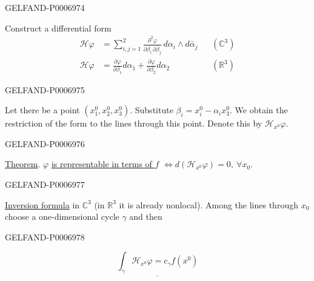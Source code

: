 \begin{GelfandAdjacentEvidence}{GELFAND-P000697}{4}


Construct a differential form
\[
\begin{aligned}
\mathcal H\varphi
&=\sum_{i,j=1}^{2}
\frac{\partial^2\varphi}{\partial\beta_i\,\partial\bar{\beta}_j}\,
d\alpha_i\wedge d\bar{\alpha}_j
&&(\mathbb C^3)\\
\mathcal H\varphi
&=\frac{\partial\varphi}{\partial\beta_1}d\alpha_1
+\frac{\partial\varphi}{\partial\beta_2}d\alpha_2
&&(\mathbb R^3)
\end{aligned}
\]
\end{GelfandAdjacentEvidence}
\begin{GelfandAdjacentEvidence}{GELFAND-P000697}{5}


Let there be a point \((x_1^0,x_2^0,x_3^0)\).
Substitute \(\beta_i=x_i^0-\alpha_i x_3^0\).
We obtain the restriction of the form to the lines through this point.
Denote this by \(\mathcal H_{x^0}\varphi\).
\end{GelfandAdjacentEvidence}
\begin{GelfandAdjacentEvidence}{GELFAND-P000697}{6}


\underline{Theorem}.
\(\varphi\) \underline{is representable in terms of \(f\)}
\(\Longleftrightarrow d(\mathcal H_{x^0}\varphi)=0,\ \forall x_0\).
\end{GelfandAdjacentEvidence}
\begin{GelfandAdjacentEvidence}{GELFAND-P000697}{7}


\underline{Inversion formula} in \(\mathbb C^3\) (in \(\mathbb R^3\) it is already nonlocal).
Among the lines through \(x_0\) choose a one-dimensional cycle \(\gamma\) and then
\end{GelfandAdjacentEvidence}
\begin{GelfandAdjacentEvidence}{GELFAND-P000697}{8}

\[
\underline{\int_\gamma \mathcal H_{x^0}\varphi=c_\gamma f(x^0)}
\]
\end{GelfandAdjacentEvidence}
